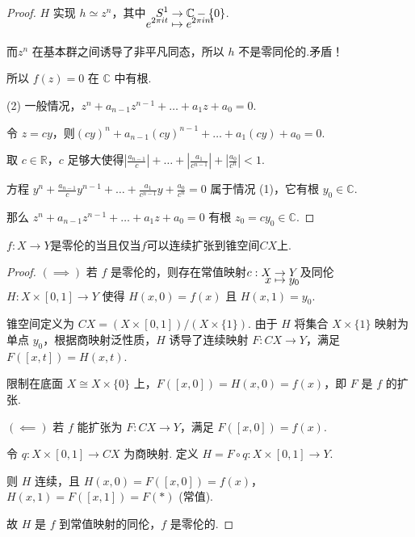 \begin{proof}
    $H$ 实现 $h \simeq z^n$，其中$\setjot[-4]\begin{aligned}[t]
        S^1 &\to \mathbb{C}-\{0\} \\
        e^{2\pi i t} &\mapsto e^{2\pi i n t}
    \end{aligned}$.\par
    而$z^n$ 在基本群之间诱导了非平凡同态，所以 $h$ 不是零同伦的.矛盾！ \par
    所以 $f(z)=0$ 在 $\mathbb{C}$ 中有根.\par
    (2) 一般情况，$z^n + a_{n-1}z^{n-1} + \dots + a_1 z + a_0 = 0$.\par
    令 $z=cy$，则$(cy)^n + a_{n-1}(cy)^{n-1} + \dots + a_1(cy) + a_0 = 0$.\par
    取 $c \in \mathbb{R}$，$c$ 足够大使得$\left|\frac{a_{n-1}}{c}\right| + \dots + \left|\frac{a_1}{c^{n-1}}\right| + \left|\frac{a_0}{c^n}\right| < 1$.\par
    方程 $y^n + \frac{a_{n-1}}{c}y^{n-1} + \dots + \frac{a_1}{c^{n-1}}y + \frac{a_0}{c^n} = 0$ 属于情况 (1)，它有根 $y_0 \in \mathbb{C}$.\par
    那么 $z^n + a_{n-1}z^{n-1} + \dots + a_1 z + a_0 = 0$ 有根 $z_0 = c y_0 \in \mathbb{C}$.
\end{proof}

\begin{lemma}[][lem:11.2]
    $f:X\to Y$是零伦的当且仅当$f$可以连续扩张到锥空间$CX$上.
\end{lemma}
\begin{proof}
    $(\implies)$
    若 $f$ 是零伦的，则存在常值映射$\setjot[-6]\begin{aligned}[t]
        c: X &\to Y \\
        x &\mapsto y_0
    \end{aligned}$及同伦$H: X \times [0, 1] \to Y$ 使得 $H(x, 0) = f(x)$ 且 $H(x, 1) = y_0$.\par
    锥空间定义为 $CX = (X \times [0, 1]) / (X \times \{1\})$.
    由于 $H$ 将集合 $X \times \{1\}$ 映射为单点 $y_0$，根据商映射泛性质，$H$ 诱导了连续映射 $F: CX \to Y$，满足 $F([x, t]) = H(x, t)$.\par
    限制在底面 $X \cong X \times \{0\}$ 上，$F([x, 0]) = H(x, 0) = f(x)$，即 $F$ 是 $f$ 的扩张.\par
    $(\impliedby)$
    若 $f$ 能扩张为 $F: CX \to Y$，满足 $F([x, 0]) = f(x)$.\par
    令 $q: X \times [0, 1] \to CX$ 为商映射. 定义 $H = F \circ q: X \times [0, 1] \to Y$.\par
    则 $H$ 连续，且 $H(x, 0) = F([x, 0]) = f(x)$，$H(x, 1) = F([x, 1]) = F(*)$ (常值).\par
    故 $H$ 是 $f$ 到常值映射的同伦，$f$ 是零伦的.
\end{proof}


